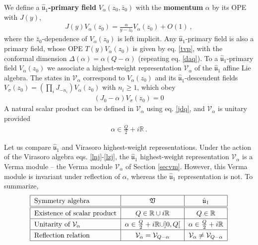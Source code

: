 \documentclass[12pt, a4paper, notitlepage, twoside]{report}
\numberwithin{equation}{section}
\theoremstyle{break}
\begin{document}
We define a \textbf{\boldmath $\hat{\mathfrak{u}}_1$-primary field} $V_{\alpha}(z_0,\bar{z}_0)$ with the \textbf{\boldmath momentum} $\alpha$ by its OPE with $J(y)$,
\begin{align}
 \boxed{J(y) V_\alpha(z_0) = \frac{\alpha}{y-z_0} V_\alpha(z_0) + O(1)}\ ,
\label{jva}
\end{align}
where the $\bar{z}_0$-dependence of $V_\alpha(z_0)$ is left implicit. 
Any $\hat{\mathfrak{u}}_1$-primary field is also a primary field, whose OPE $T(y)V_\alpha(z_0)$ is given by eq. \eqref{tvp}, with the conformal dimension $\Delta(\alpha) = \alpha(Q-\alpha)$ (repeating eq. \eqref{daq}).
To a $\hat{\mathfrak{u}}_1$-primary field $V_\alpha(z_0)$ we associate a highest-weight representation $\mathcal{V}_\alpha$ of the $\hat{\mathfrak{u}}_1$ affine Lie algebra.
The states in $\mathcal{V}_\alpha$ correspond to $V_\alpha(z_0)$ and its $\hat{\mathfrak{u}}_1$-descendent fields $V_\sigma(z_0)=\left(\prod_i J_{-n_i}\right) V_\alpha(z_0)$ with $n_i\geq 1$, which obey 
\begin{align}
 \left(J_0 - \alpha\right) V_\sigma(z_0) = 0
\label{jma}
\end{align}
A natural scalar product can be defined in $\mathcal{V}_\alpha$ using eq. \eqref{jdq}, and $\mathcal{V}_\alpha$ is unitary provided
\begin{align}
 \alpha \in \frac{Q}{2} + i{\mathbb{R}}\ .
\label{aif}
\end{align}

Let us compare $\hat{\mathfrak{u}}_1$ and Virasoro highest-weight representations. 
Under the action of the Virasoro algebra eqs. \eqref{lnj}-\eqref{lzj}, the $\hat{\mathfrak{u}}_1$ highest-weight representation $\mathcal{V}_\alpha$ is a Verma module -- the Verma module $\mathcal{V}_\alpha$ of Section \ref{secvm}.
However, this Verma module is invariant under reflection of $\alpha$, whereas the $\hat{\mathfrak{u}}_1$ representation is not.
To summarize,
\begin{align}
\renewcommand{\arraystretch}{1.3}
 \begin{tabular}{|l|c|c|}
  \hline
 Symmetry algebra  & $\mathfrak{V}$ & $\hat{\mathfrak{u}}_1 $
\\
\hline\hline
 Existence of scalar product & $Q\in {\mathbb{R}} \cup i{\mathbb{R}} $ & $Q\in {\mathbb{R}}$ 
\\
\hline
 Unitarity of $\mathcal{V}_\alpha$ & $\alpha\in \frac{Q}{2}+i{\mathbb{R}} \cup ]0,Q[ $ & $\alpha \in \frac{Q}{2}+i{\mathbb{R}}$
\\
\hline 
 Reflection relation  & $\mathcal{V}_\alpha = \mathcal{V}_{Q-\alpha} $ & $\mathcal{V}_\alpha \neq \mathcal{V}_{Q-\alpha} $ 
\\
\hline
 \end{tabular}
\end{align}
\end{document}
